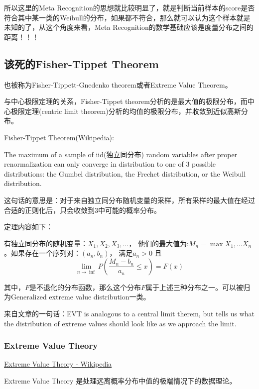 所以这里的Meta Recognition的思想就比较明显了，就是判断当前样本的score是否符合其中某一类的Weibull的分布，如果都不符合，那么就可以认为这个样本就是未知的了，从这个角度来看，Meta Recognition的数学基础应该是度量分布之间的距离！！！


\subsection{该死的Fisher-Tippet Theorem}

也被称为Fisher-Tippett-Gnedenko theorem或者Extreme Value Theorem。

与中心极限定理的关系，Fisher-Tippet theorem分析的是最大值的极限分布，而中心极限定理(centric limit theorem)分析的均值的极限分布，并收敛到近似高斯分布。

Fisher-Tippet Theorem(Wikipedia):

The maximum of a sample of iid(独立同分布) random variables after proper renormalization can only converge in distribution to one of 3 possible distributions: the Gumbel distribution, the Frechet distribution, or the Weibull distribution.

这句话的意思是：对于来自独立同分布随机变量的采样，所有采样的最大值在经过合适的正则化后，只会收敛到3中可能的概率分布。

定理内容如下：

有独立同分布的随机变量：$X_1, X_2, X_3, \ldots$， 他们的最大值为:$M_n = \max {X_1, \ldots X_n}$。如果存在一个序列对：$(a_n, b_n)$， 满足$a_n > 0$ 且
\begin{displaymath}
\lim_{n \rightarrow \inf} P \left( \frac{M_n - b_n}{a_n} \le x \right) = F(x)
\end{displaymath}

其中，$F$是不退化的分布函数，那么这个分布$F$属于上述三种分布之一。可以被归为Generalized extreme value distribution一类。

来自文章的一句话：EVT is analogous to a central limit therem, but tells us what the distribution of extreme values should look like as we approach the limit.




\subsubsection{Extreme Value Theory}

\href{https://en.wikipedia.org/wiki/Extreme_value_theory}{Extreme Value Theory - Wikipedia}

Extreme Value Theory 是处理远离概率分布中值的极端情况下的数据理论。

